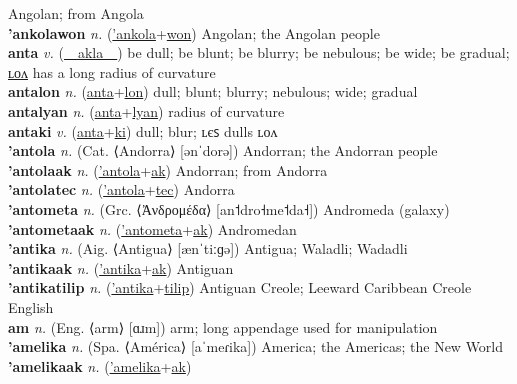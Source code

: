 Angolan; from Angola \label{'ankolaak} \\
\textbf{'ankolawon} \textit{n.} (\hyperref['ankola]{'ankola}+\hyperref[won]{won})
Angolan; the Angolan people \label{'ankolawon} \\
\textbf{anta} \textit{v.} (\hyperref[akla]{~~akla~~})
be dull; be blunt; be blurry; be nebulous; be wide; be gradual; \hyperref[antalon]{ʟᴏᴧ} has a long radius of curvature \label{anta} \\
\textbf{antalon} \textit{n.} (\hyperref[anta]{anta}+\hyperref[lon]{lon})
dull; blunt; blurry; nebulous; wide; gradual \label{antalon} \\
\textbf{antalyan} \textit{n.} (\hyperref[anta]{anta}+\hyperref[lyan]{lyan})
radius of curvature \label{antalyan} \\
\textbf{antaki} \textit{v.} (\hyperref[anta]{anta}+\hyperref[ki]{ki})
dull; blur; ʟєꜱ dulls ʟᴏᴧ \label{antaki} \\
\textbf{'antola} \textit{n.} (Cat. ⟨Andorra⟩ [ənˈdorə])
Andorran; the Andorran people \label{'antola} \\
\textbf{'antolaak} \textit{n.} (\hyperref['antola]{'antola}+\hyperref[ak]{ak})
Andorran; from Andorra \label{'antolaak} \\
\textbf{'antolatec} \textit{n.} (\hyperref['antola]{'antola}+\hyperref[tec]{tec})
Andorra \label{'antolatec} \\
\textbf{'antometa} \textit{n.} (Grc. ⟨Ἀνδρομέδα⟩ [an˦dro˧me˦da˧])
Andromeda (galaxy) \label{'antometa} \\
\textbf{'antometaak} \textit{n.} (\hyperref['antometa]{'antometa}+\hyperref[ak]{ak})
Andromedan \label{'antometaak} \\
\textbf{'antika} \textit{n.} (Aig. ⟨Antigua⟩ [ænˈtiːɡə])
Antigua; Waladli; Wadadli \label{'antika} \\
\textbf{'antikaak} \textit{n.} (\hyperref['antika]{'antika}+\hyperref[ak]{ak})
Antiguan \label{'antikaak} \\
\textbf{'antikatilip} \textit{n.} (\hyperref['antika]{'antika}+\hyperref[tilip]{tilip})
Antiguan Creole; Leeward Caribbean Creole English \label{'antikatilip} \\
\textbf{am} \textit{n.} (Eng. ⟨arm⟩ [ɑɹm])
arm; long appendage used for manipulation \label{am} \\
\textbf{'amelika} \textit{n.} (Spa. ⟨América⟩ [aˈmeɾika])
America; the Americas; the New World \label{'amelika} \\
\textbf{'amelikaak} \textit{n.} (\hyperref['amelika]{'amelika}+\hyperref[ak]{ak})

